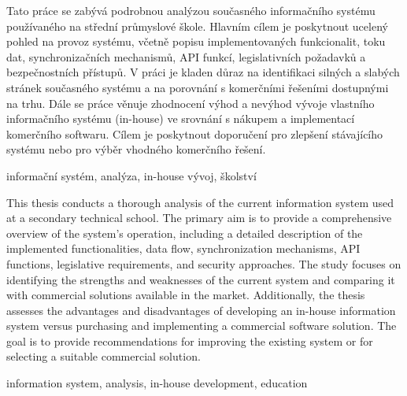 \documentclass[FM,Proj]{tulthesis}
\begin{document}

\begin{abstractCZ}
Tato práce se zabývá podrobnou analýzou současného informačního systému používaného
na střední průmyslové škole. Hlavním cílem je poskytnout ucelený pohled na provoz
systému, včetně popisu implementovaných funkcionalit, toku dat, synchronizačních 
mechanismů, API funkcí, legislativních požadavků a 
bezpečnostních přístupů. V práci je kladen důraz na identifikaci silných a 
slabých stránek současného systému a na porovnání s komerčními řešeními dostupnými
na trhu. Dále se práce věnuje zhodnocení výhod a nevýhod vývoje vlastního informačního
systému (in-house) ve srovnání s nákupem a implementací komerčního softwaru. Cílem 
je poskytnout doporučení pro zlepšení stávajícího systému nebo pro výběr 
vhodného komerčního řešení.
\end{abstractCZ}

\begin{keywordsCZ}
informační systém, analýza, in-house vývoj, školství
\end{keywordsCZ}

\vspace{2cm}

\begin{abstractEN}
This thesis conducts a thorough analysis of the current information system
used at a secondary technical school. The primary aim is to provide a comprehensive 
overview of the system's operation, including a detailed description of the implemented 
functionalities, data flow, synchronization mechanisms, API functions,
legislative requirements, and security approaches. The study focuses on identifying 
the strengths and weaknesses of the current system and comparing it with commercial 
solutions available in the market. Additionally, the thesis assesses the advantages 
and disadvantages of developing an in-house information system versus purchasing and 
implementing a commercial software solution. The goal is to provide recommendations 
for improving the existing system or for selecting a suitable commercial solution.
\end{abstractEN}

\begin{keywordsEN}
information system, analysis, in-house development, education
\end{keywordsEN}

\clearpage
\end{document}
